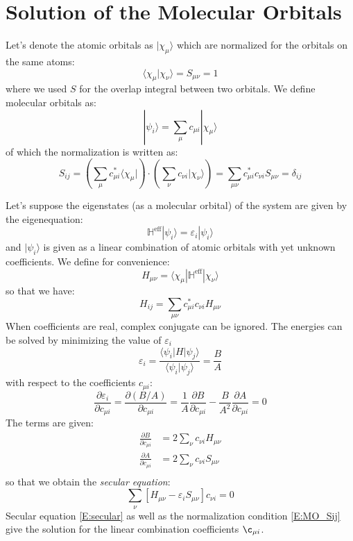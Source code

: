 \documentclass{article}
\newcommand{\heff}{\mathbb{H}^{\text{eff}}}
\newcommand{\pfrac}[2]{\frac{\partial #1}{\partial #2}}
\begin{document}
\section{Solution of the Molecular Orbitals}
Let's denote the atomic orbitals as $|\chi_{\mu}\rangle$ which are normalized for the orbitals on the same atoms:
\[ \langle \chi_{\mu} | \chi_{\nu} \rangle =  S_{\mu\nu} = 1\]
where we used $S$ for the overlap integral between two orbitals. We define molecular orbitals as:
\begin{equation}
    | \psi_i \rangle = \sum_{\mu} c_{\mu i} | \chi_{\mu} \rangle
\end{equation}
of which the normalization is written as:
\begin{equation}
    \label{E:MO_Sij}
    S_{ij} = \left( \sum_{\mu} c_{\mu i}^* \langle \chi_{\mu} | \right) \cdot \left( \sum_{\nu} c_{\nu i} | \chi_{\nu} \rangle \right) = \sum_{\mu\nu} c_{\mu i}^* c_{\nu i} S_{\mu \nu} = \delta_{ij}
\end{equation}

Let's suppose the eigenstates (as a molecular orbital) of the system are given by the eigenequation:
\begin{equation}
    \heff | \psi_i \rangle = \varepsilon_i | \psi_i \rangle
\end{equation}
and $| \psi_i \rangle$ is given as a linear combination of atomic orbitals with yet unknown coefficients. 
We define for convenience:
\[H_{\mu\nu} = \langle \chi_{\mu} | \heff | \chi_{\nu} \rangle\]
so that we have:
\begin{equation}
    \label{E:MO_Hij}
    H_{ij}  = \sum_{\mu\nu} c_{\mu i}^* c_{\nu i} H_{\mu \nu}
\end{equation}
When coefficients are real, complex conjugate can be ignored. The energies can be solved by minimizing the value of $\varepsilon_i$
\begin{equation}
    \varepsilon_i = \frac{\langle \psi_i | H | \psi_j \rangle}{\langle \psi_i | \psi_j \rangle} = \frac{B}{A}
\end{equation}
with respect to the coefficients $c_{\mu i}$:
\begin{equation}
    \pfrac{\varepsilon_i}{c_{\mu i}} = \pfrac{(B/A)}{c_{\mu i}} = \frac{1}{A} \pfrac{B}{c_{\mu i}} - \frac{B}{A^2} \pfrac{A}{c_{\mu i}} = 0
\end{equation}
The terms are given:
\begin{align}
    \pfrac{B}{c_{\mu i}} &= 2 \sum_{\nu} c_{\nu i} H_{\mu \nu} \\
    \pfrac{A}{c_{\mu i}} &= 2 \sum_{\nu} c_{\nu i} S_{\mu \nu} \\
\end{align}
so that we obtain the \emph{secular equation}:
\begin{equation}
    \label{E:secular}
    \sum_{\nu} \left[ H_{\mu\nu} - \varepsilon_i S_{\mu\nu} \right] c_{\nu i} = 0
\end{equation}
Secular equation \eqref{E:secular} as well as the normalization condition \eqref{E:MO_Sij} give the solution 
for the linear combination coefficients $\c_{\mu i}$.
\end{document}

